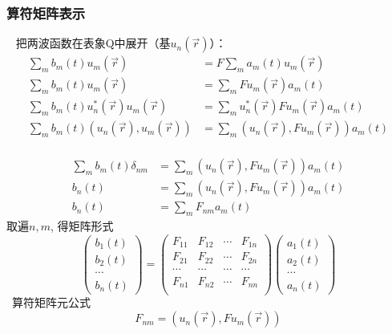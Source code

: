 \begin{frame}
    \frametitle{算符矩阵表示}    
    \解~ 把两波函数在表象Q中展开（基$u_n(\vec{r})$）：\\
    \begin{equation*}
        \begin{split} 
         \sum_m b_m(t)u_m(\vec{r})&= F\sum_m a_m(t)u_m(\vec{r}) \\
         \sum_m b_m(t)u_m(\vec{r})&= \sum_m Fu_m(\vec{r})a_m(t) \\
         \sum_m b_m(t)u_n ^*(\vec{r}) u_m(\vec{r})&= \sum_m u_n ^*(\vec{r}) Fu_m(\vec{r})a_m(t) \\
         \sum_m b_m(t)(u_n (\vec{r}), u_m(\vec{r}))&= \sum_m (u_n (\vec{r}), Fu_m(\vec{r}))a_m(t) \\
        \end{split}  
    \end{equation*} 
\end{frame}

\begin{frame} 
    \begin{equation*}
        \begin{split} 
         \sum_m b_m(t)\delta_{nm}&= \sum_m (u_n (\vec{r}), Fu_m(\vec{r}))a_m(t) \\
         b_n(t)&= \sum_m (u_n (\vec{r}), Fu_m(\vec{r}))a_m(t) \\
         b_n(t)&= \sum_m F_{nm} a_m(t) 
        \end{split}  
    \end{equation*} 
    取遍$n, m$, 得矩阵形式
    $$\begin{pmatrix}
        b_1(t)\\
        b_2(t)\\
        \cdots \\
        b_n(t)
    \end{pmatrix}
    =
    \begin{pmatrix}
       F_{11} & F_{12} & \cdots & F_{1n} \\
       F_{21} & F_{22} & \cdots & F_{2n} \\
       \cdots & \cdots &  \cdots& \cdots\\
        F_{n1} & F_{n2} & \cdots & F_{nn} \\
    \end{pmatrix}
    \begin{pmatrix}
        a_1(t)\\
        a_2(t)\\
        \cdots \\
        a_n(t)
    \end{pmatrix}
    $$
    \Tips~算符矩阵元公式 $$ F_{nm}=(u_n (\vec{r}), Fu_m(\vec{r})) $$
\end{frame} 

